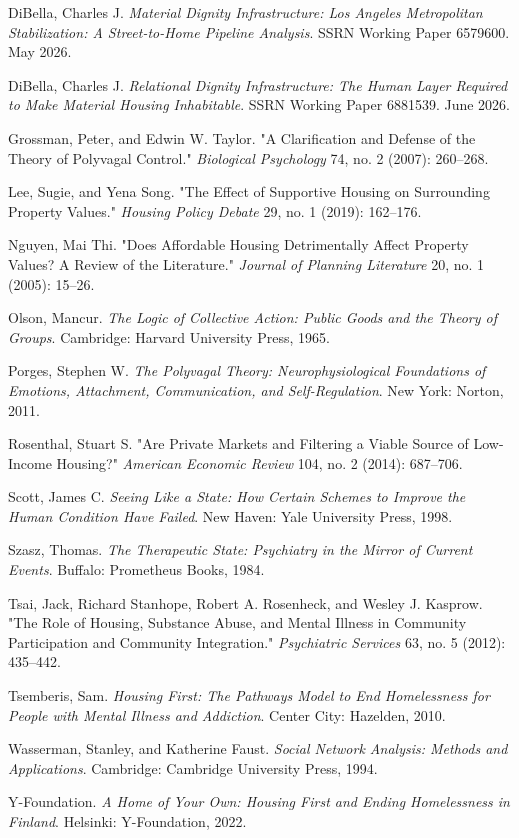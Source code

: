 \documentclass[12pt, letterpaper]{article}
\begin{document}
DiBella, Charles J. \textit{Material Dignity Infrastructure: Los Angeles Metropolitan Stabilization: A Street-to-Home Pipeline Analysis}. SSRN Working Paper 6579600. May 2026.

DiBella, Charles J. \textit{Relational Dignity Infrastructure: The Human Layer Required to Make Material Housing Inhabitable}. SSRN Working Paper 6881539. June 2026.

Grossman, Peter, and Edwin W. Taylor. "A Clarification and Defense of the Theory of Polyvagal Control." \textit{Biological Psychology} 74, no. 2 (2007): 260–268.

Lee, Sugie, and Yena Song. "The Effect of Supportive Housing on Surrounding Property Values." \textit{Housing Policy Debate} 29, no. 1 (2019): 162–176.

Nguyen, Mai Thi. "Does Affordable Housing Detrimentally Affect Property Values? A Review of the Literature." \textit{Journal of Planning Literature} 20, no. 1 (2005): 15–26.

Olson, Mancur. \textit{The Logic of Collective Action: Public Goods and the Theory of Groups}. Cambridge: Harvard University Press, 1965.

Porges, Stephen W. \textit{The Polyvagal Theory: Neurophysiological Foundations of Emotions, Attachment, Communication, and Self-Regulation}. New York: Norton, 2011.

Rosenthal, Stuart S. "Are Private Markets and Filtering a Viable Source of Low-Income Housing?" \textit{American Economic Review} 104, no. 2 (2014): 687–706.

Scott, James C. \textit{Seeing Like a State: How Certain Schemes to Improve the Human Condition Have Failed}. New Haven: Yale University Press, 1998.

Szasz, Thomas. \textit{The Therapeutic State: Psychiatry in the Mirror of Current Events}. Buffalo: Prometheus Books, 1984.

Tsai, Jack, Richard Stanhope, Robert A. Rosenheck, and Wesley J. Kasprow. "The Role of Housing, Substance Abuse, and Mental Illness in Community Participation and Community Integration." \textit{Psychiatric Services} 63, no. 5 (2012): 435–442.

Tsemberis, Sam. \textit{Housing First: The Pathways Model to End Homelessness for People with Mental Illness and Addiction}. Center City: Hazelden, 2010.

Wasserman, Stanley, and Katherine Faust. \textit{Social Network Analysis: Methods and Applications}. Cambridge: Cambridge University Press, 1994.

Y-Foundation. \textit{A Home of Your Own: Housing First and Ending Homelessness in Finland}. Helsinki: Y-Foundation, 2022.
\end{document}
